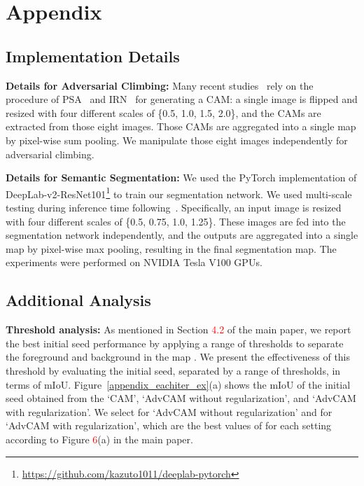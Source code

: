 \documentclass[final]{cvpr}
\begin{document}
\section{Appendix}
\subsection{Implementation Details}
\textbf{Details for Adversarial Climbing:}
Many recent studies~\cite{wang2020self, chang2020weakly, zhang2020causal} rely on the procedure of PSA~\cite{ahn2018learning} and IRN~\cite{ahn2019weakly} for generating a CAM: a single image is flipped and resized with four different scales of \{0.5, 1.0, 1.5, 2.0\}, and the CAMs are extracted from those eight images. Those CAMs are aggregated into a single map by pixel-wise sum pooling.
We manipulate those eight images independently for adversarial climbing.


\textbf{Details for Semantic Segmentation:} 
We used the PyTorch implementation of DeepLab-v2-ResNet101\footnote{\url{https://github.com/kazuto1011/deeplab-pytorch}} to train our segmentation network.
We used multi-scale testing during inference time following~\cite{wang2020self, ahn2019weakly, ahn2018learning, lee2019ficklenet, lee2019frame}. Specifically, an input image is resized with four different scales of \{0.5, 0.75, 1.0, 1.25\}. These images are fed into the segmentation network independently, and the outputs are aggregated into a single map by pixel-wise max pooling, resulting in the final segmentation map. The experiments were performed on NVIDIA Tesla V100 GPUs.


\subsection{Additional Analysis}

\textbf{Threshold analysis:} 
As mentioned in Section \textcolor{red}{4.2} of the main paper, we report the best initial seed performance by applying a range of thresholds to separate the foreground and background in the map . 
We present the effectiveness of this threshold by evaluating the initial seed, separated by a range of thresholds, in terms of mIoU. Figure~\ref{appendix_eachiter_ex}(a) shows the mIoU of the initial seed obtained from the `CAM', `AdvCAM without regularization', and `AdvCAM with regularization'. We select  for `AdvCAM without regularization' and  for `AdvCAM with regularization', which are the best values of  for each setting according to Figure \textcolor{red}{6}(a) in the main paper.
\end{document}
